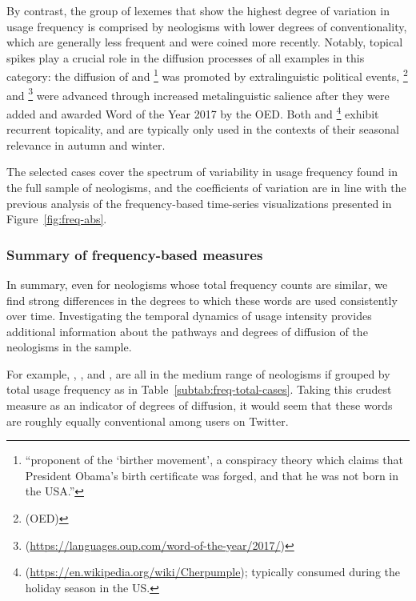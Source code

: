\documentclass[
  a4paper,
  abstract=on,
  captions=tableabove
  ]{scrartcl}
\begin{document}
      By contrast, the group of lexemes that show the highest degree of variation in usage frequency is comprised by neologisms with lower degrees of conventionality, which are generally less frequent and were coined more recently. Notably, topical spikes play a crucial role in the diffusion processes of all examples in this category: the diffusion of  and \footnote{\enquote{proponent of the \enquote{birther movement}, a conspiracy theory which claims that President Obama's birth certificate was forged, and that he was not born in the USA.}} was promoted by extralinguistic political events, \footnote{ (OED)} and \footnote{ (\url{https://languages.oup.com/word-of-the-year/2017/})} were advanced through increased metalinguistic salience after they were added and awarded Word of the Year 2017 by the OED. Both  and \footnote{ (\url{https://en.wikipedia.org/wiki/Cherpumple}); typically consumed during the holiday season in the US.} exhibit recurrent topicality, and are typically only used in the contexts of their seasonal relevance in autumn and winter.

      The selected cases cover the spectrum of variability in usage frequency found in the full sample of neologisms, and the coefficients of variation are in line with the previous analysis of the frequency-based time-series visualizations presented in Figure~\ref{fig:freq-abs}.


      \subsubsection{Summary of frequency-based measures}

        In summary, even for neologisms whose total frequency counts are similar, we find strong differences in the degrees to which these words are used consistently over time. Investigating the temporal dynamics of usage intensity provides additional information about the pathways and degrees of diffusion of the neologisms in the sample.

        For example, , , and , are all in the medium range of neologisms if grouped by total usage frequency as in Table~\ref{subtab:freq-total-cases}. Taking this crudest measure as an indicator of degrees of diffusion, it would seem that these words are roughly equally conventional among users on Twitter.
\end{document}

